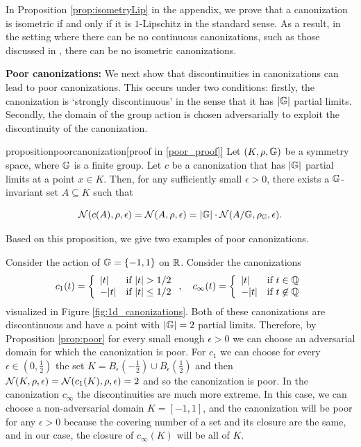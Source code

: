 In Proposition \ref{prop:isometryLip} in the appendix, we prove that a canonization is isometric if and only if it is $1$-Lipschitz in the standard sense.  As a result, in the setting where there can be no continuous canonizations, such as those discussed in  \cite{dym2024equivariant,pmlr-v235-baker24a}, there can be no isometric canonizations.

\textbf{Poor canonizations:} We next show that discontinuities in canonizations can lead to poor canonizations. This occurs under two conditions: firstly, the canonization is `strongly discontinuous' in the sense that it has $|\mathbb{G}|$ partial limits. Secondly, the domain  of the group action is chosen adversarially to exploit the discontinuity of the canonization.
\begin{restatable}{proposition}{poorcanonization}[proof in \ref{poor_proof}]
\label{prop:poor}
Let $(K,\rho,\mathbb{G})$ be a symmetry space, where $\mathbb{G}$ is a finite group. Let $c$ be a canonization that has $|\mathbb{G}|$ partial limits at a point $x\in K$. Then, for any sufficiently small $\epsilon>0$, there exists a $\mathbb{G}$-invariant set $A\subseteq K$ such that

$$
\mathcal{N}(c(A),\rho,\epsilon)
=
\mathcal{N}(A,\rho,\epsilon)
=
|\mathbb{G}|\cdot \mathcal{N}(A/\mathbb{G},\rho_{\mathbb{G}},\epsilon).
$$

\end{restatable}


Based on this proposition, we give two examples of poor canonizations. 

\begin{example}
\label{ex:sign_poor}
Consider the action of $\mathbb{G}=\{-1,1\}$ on $\mathbb{R} $. Consider the canonizations
$$c_1(t)=\twopartdef{|t|}{|t|>1/2}{-|t|}{|t|\leq 1/2}, \quad  c_\infty(t)=\twopartdef{|t|}{t\in \mathbb{Q}}{-|t|}{t\not \in \mathbb{Q}} $$
visualized in Figure \ref{fig:1d_canonizations}. Both of these canonizations are discontinuous and have a point with $|\mathbb{G}|=2 $ partial limits. Therefore, by  Proposition \ref{prop:poor} for every small enough $\epsilon>0$ we can choose an adversarial domain for which the canonization is poor. For $c_1$ we can choose for every $\epsilon\in (0,\frac{1}{2})$ the set  $K=B_\epsilon(-\frac{1}{2})\cup B_\epsilon(\frac{1}{2})$ and then $\mathcal{N}(K,\rho,\epsilon)=\mathcal{N}(c_1(K),\rho,\epsilon)=2$ and so the canonization is poor.
In the canonization $c_\infty$ the discontinuities are much more extreme. In this case, we can choose a non-adversarial domain $K=[-1,1]$, and the canonization will be poor for any $\epsilon>0$ because the covering number of a set and its closure are the same, and in our case, the closure of $c_{\infty}(K)$ will be all of $K$.
\end{example}

